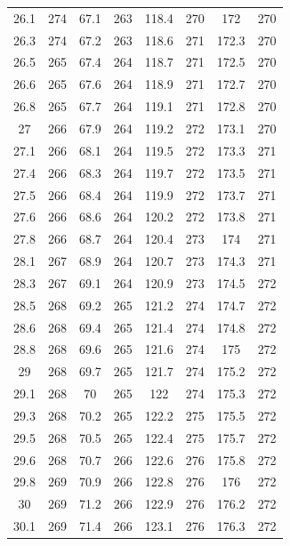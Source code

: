 \documentclass[12pt]{ctexart}
\numberwithin{equation}{section}
\begin{document}
\begin{longtable}{cc|cc|cc|cc}
26.1  &  274  &  67.1  &  263  &  118.4  &  270  &  172  &  270  \\
26.3  &  274  &  67.2  &  263  &  118.6  &  271  &  172.3  &  270  \\
26.5  &  265  &  67.4  &  264  &  118.7  &  271  &  172.5  &  270  \\
26.6  &  265  &  67.6  &  264  &  118.9  &  271  &  172.7  &  270  \\
26.8  &  265  &  67.7  &  264  &  119.1  &  271  &  172.8  &  270  \\
27  &  266  &  67.9  &  264  &  119.2  &  272  &  173.1  &  270  \\
27.1  &  266  &  68.1  &  264  &  119.5  &  272  &  173.3  &  271  \\
27.4  &  266  &  68.3  &  264  &  119.7  &  272  &  173.5  &  271  \\
27.5  &  266  &  68.4  &  264  &  119.9  &  272  &  173.7  &  271  \\
27.6  &  266  &  68.6  &  264  &  120.2  &  272  &  173.8  &  271  \\
27.8  &  266  &  68.7  &  264  &  120.4  &  273  &  174  &  271  \\
28.1  &  267  &  68.9  &  264  &  120.7  &  273  &  174.3  &  271  \\
28.3  &  267  &  69.1  &  264  &  120.9  &  273  &  174.5  &  272  \\
28.5  &  268  &  69.2  &  265  &  121.2  &  274  &  174.7  &  272  \\
28.6  &  268  &  69.4  &  265  &  121.4  &  274  &  174.8  &  272  \\
28.8  &  268  &  69.6  &  265  &  121.6  &  274  &  175  &  272  \\
29  &  268  &  69.7  &  265  &  121.7  &  274  &  175.2  &  272  \\
29.1  &  268  &  70  &  265  &  122  &  274  &  175.3  &  272  \\
29.3  &  268  &  70.2  &  265  &  122.2  &  275  &  175.5  &  272  \\
29.5  &  268  &  70.5  &  265  &  122.4  &  275  &  175.7  &  272  \\
29.6  &  268  &  70.7  &  266  &  122.6  &  276  &  175.8  &  272  \\
29.8  &  269  &  70.9  &  266  &  122.8  &  276  &  176  &  272  \\
30  &  269  &  71.2  &  266  &  122.9  &  276  &  176.2  &  272  \\
30.1  &  269  &  71.4  &  266  &  123.1  &  276  &  176.3  &  272  \\

\end{longtable}
\end{document}
